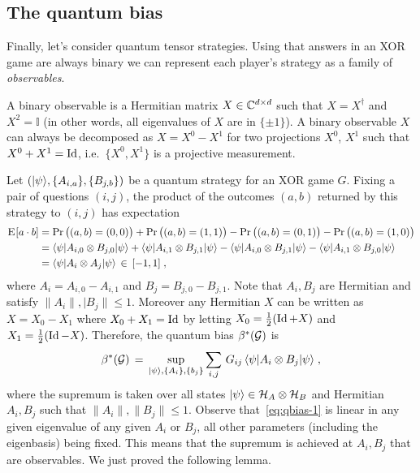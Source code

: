 \subsection{The quantum bias}

Finally, let's consider quantum tensor strategies. Using that answers in an XOR game are always binary we can represent each player's strategy as a family of \emph{observables}.

\begin{definition}
A binary observable is a Hermitian matrix $X\in \mathbb{C}^{d\times d}$ such that $X=X^\dagger$ and $X^2=\mathbb{I}$ (in other words, all eigenvalues of $X$ are in $\{\pm 1\}$). A binary observable $X$ can always be decomposed as $X = X^0 - X^1$ for two projections $X^0$, $X^1$ such that $X^0+X^1 = \mathop{\rm Id}\nolimits$, i.e.\ $\{X^0,X^1\}$ is a projective measurement. 
\end{definition}

Let $(|\psi\rangle,\{A_{i,a}\},\{B_{j,b}\})$ be a quantum strategy for an XOR game $G$. Fixing a pair of questions $(i,j)$, the product of the outcomes $(a,b)$ returned by this strategy to $(i,j)$ has expectation
\begin{align*}
\textsc{E}_{}[a\cdot b] &= \Pr\big( (a,b)=(0,0) \big) + \Pr\big( (a,b)=(1,1) \big) - \Pr\big( (a,b)=(0,1) \big)  - \Pr\big( (a,b)=(1,0) \big) \\
&=  \langle\psi| A_{i,0} \otimes B_{j,0} |\psi\rangle + \langle\psi| A_{i,1} \otimes B_{j,1} |\psi\rangle - \langle\psi| A_{i,0} \otimes B_{j,1} |\psi\rangle - \langle\psi| A_{i,1} \otimes B_{j,0}|\psi\rangle\\
&=  \langle\psi|A_i \otimes A_j |\psi\rangle \,\in\,[-1,1]\;,
\end{align*}
where $A_i = A_{i,0}-A_{i,1}$ and $B_j=B_{j,0}-B_{j,1}$. Note that $A_i,B_j$ are Hermitian and satisfy $\|A_i\|,|B_j\|\leq 1$. Moreover any Hermitian $X$ can be written as $X=X_0-X_1$ where $X_0+X_1=\mathop{\rm Id}\nolimits$ by letting $X_0 = \frac{1}{2}(\mathop{\rm Id}\nolimits+X)$ and $X_1=\frac{1}{2}(\mathop{\rm Id}\nolimits-X)$. Therefore, the quantum bias $\beta^*(\mathcal{G})$ is 
\begin{equation}\label{eq:qbias-1}
\beta^*(\mathcal{G}) \,=\, \sup_{|\psi\rangle,\{A_i\},\{b_j\}} \sum_{i,j} \,G_{ij}\, \langle\psi| A_i \otimes B_j |\psi\rangle\;,
\end{equation}
where the supremum is taken over all states $|\psi\rangle\in \mathcal{H}_A\otimes \mathcal{H}_B$ and Hermitian $A_i,B_j$ such that $\|A_i\|,\|B_j\|\leq 1$. Observe that~\eqref{eq:qbias-1} is linear in any given eigenvalue of any given $A_i$ or $B_j$, all other parameters (including the eigenbasis) being fixed. This means that the supremum is achieved at $A_i,B_j$ that are observables. We just proved the following lemma.

